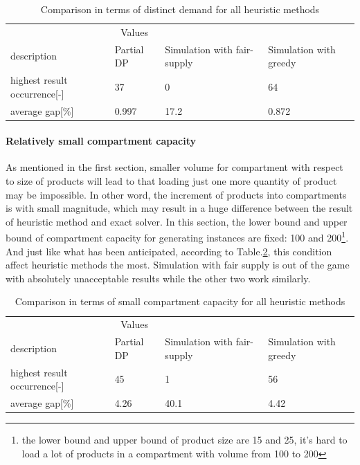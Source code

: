 \documentclass{article}
\begin{document}
\begin{table}[ht]
 \caption{Comparison in terms of distinct demand for all heuristic methods}
  \centering
  \begin{tabular}{llll}
    \toprule
    \multicolumn{3}{c}{Values}                   \\
    \cmidrule(r){2-3}
    description   & Partial DP    & Simulation with fair-supply      & Simulation with greedy \\
    \midrule
    highest result occurrence[-]	&	37 	&	0	&	64	\\
    average gap[\%]	&	0.997	&	17.2 	&	0.872 	\\
    \bottomrule
  \end{tabular}
  \label{tab:distinct demand for heu}
\end{table}

\paragraph{Relatively small compartment capacity}
As mentioned in the first section, smaller volume for compartment with respect to size of products will lead to that loading just one more quantity of product may be impossible. In other word, the increment of products into compartments is with small magnitude, which may result in a huge difference between the result of heuristic method and exact solver. In this section, the lower bound and upper bound of compartment capacity for generating instances are fixed: 100 and 200\footnote{the lower bound and upper bound of product size are 15 and 25, it's hard to load a lot of products in a compartment with volume from 100 to 200}. And just like what has been anticipated, according to Table.\ref{tab:small compartment capacity for heu}, this condition affect heuristic methods the most. Simulation with fair supply is out of the game with absolutely unacceptable results while the other two work similarly.

\begin{table}[ht]
 \caption{Comparison in terms of small compartment capacity for all heuristic methods}
  \centering
  \begin{tabular}{llll}
    \toprule
    \multicolumn{3}{c}{Values}                   \\
    \cmidrule(r){2-3}
    description   & Partial DP    & Simulation with fair-supply      & Simulation with greedy \\
    \midrule
    highest result occurrence[-]	&	45 	&	1	&	56	\\
    average gap[\%]	&	4.26	&	40.1 	&	4.42 	\\
    \bottomrule
  \end{tabular}
  \label{tab:small compartment capacity for heu}
\end{table}
\end{document}
